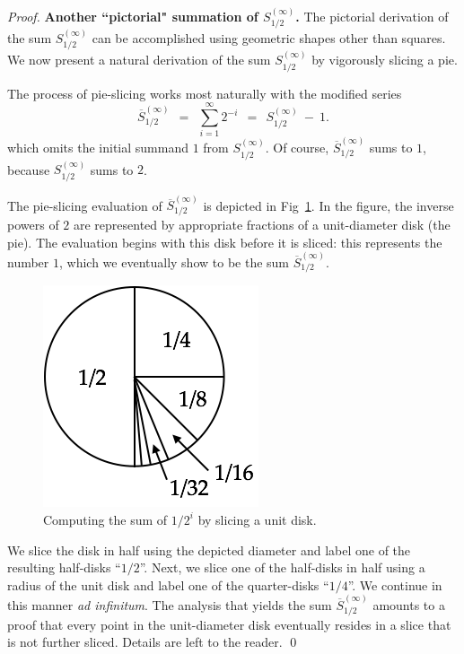 \begin{proof}
{\bf Another ``pictorial" summation of $S^{(\infty)}_{1/2}$.}
The pictorial derivation of the sum $S^{(\infty)}_{1/2}$ can be accomplished using geometric shapes other than squares.  We now present a natural derivation of the sum $S^{(\infty)}_{1/2}$ by vigorously slicing a pie.

The process of pie-slicing works most naturally with the modified series
\[ \overline{S}^{(\infty)}_{1/2} \ \ = \ \ \sum_{i=1}^\infty 2^{-i}
 \ \ = \ \ S^{(\infty)}_{1/2} \ - \ 1. \]
which omits the initial summand $1$ from $S^{(\infty)}_{1/2}$.  Of course, $\overline{S}^{(\infty)}_{1/2}$ sums to $1$, because $S^{(\infty)}_{1/2}$ sums to $2$.

\medskip

The pie-slicing evaluation of $\overline{S}^{(\infty)}_{1/2}$ is depicted in Fig~\ref{fig:sumGeo1sur2circle}.  In the figure, the inverse powers of $2$ are represented by appropriate fractions of a unit-diameter disk (the pie).  The evaluation begins with this disk before it is sliced: this represents the number $1$, which we eventually show to be the sum
$\overline{S}^{(\infty)}_{1/2}$.
\begin{figure}[htb]
\begin{center}
       \includegraphics[scale=0.35]{FiguresMaths/SumGeometric1sur2circle}
\caption{Computing the sum of $1/2^i$ by slicing a unit disk.}
       \label{fig:sumGeo1sur2circle}
\end{center}
\end{figure}
We slice the disk in half using the depicted diameter and label one of the resulting half-disks ``$1/2$''.  Next, we slice one of the half-disks in half using a radius of the unit disk and label one of the quarter-disks ``$1/4$''.  We continue in this manner {\em ad infinitum}.  The analysis that yields the sum $\overline{S}^{(\infty)}_{1/2}$ amounts to a proof that every point in the unit-diameter disk eventually resides in a slice that is not further sliced.  Details are left to the reader.  \qed
\end{proof}


